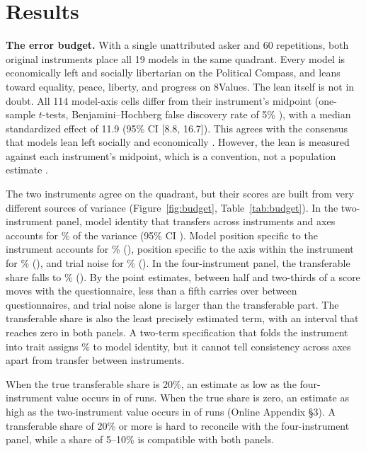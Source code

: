 \documentclass[12pt]{article}
\begin{document}
\section{Results}

\textbf{The error budget.} With a single unattributed asker
and 60 repetitions, both original instruments place all 19 models in the same quadrant. Every model is economically
left and socially libertarian on the Political Compass, and leans toward equality, peace, liberty, and progress on
8Values. The lean itself is not in doubt. All 114 model-axis cells differ from their instrument's midpoint (one-sample
$t$-tests, Benjamini--Hochberg false discovery rate of 5\% \citep{benjamini1995}), with a median standardized effect of
11.9 (95\% CI [8.8, 16.7]). This agrees with the consensus that models lean left socially and economically \citep{rozado2024, motoki2024}. However, the lean is measured against each instrument's midpoint, which is a convention,
not a population estimate \citep{gallup2024values}.

The two instruments agree on the quadrant, but their scores are built from very different sources of variance
(Figure~\ref{fig:budget}, Table~\ref{tab:budget}). In the two-instrument panel, model identity that transfers across
instruments and axes accounts for \NTwoM\% of the variance (95\% CI \NTwoMci). Model position specific to the
instrument accounts for \NTwoMI\% (\NTwoMIci), position specific to the axis within the instrument for \NTwoMA\%
(\NTwoMAci), and trial noise for \NTwoE\% (\NTwoEci). In the four-instrument panel, the transferable share falls to
\NFourM\% (\NFourMci). By the point estimates, between half and two-thirds of a score moves with the
questionnaire, less than a fifth carries over between questionnaires, and trial noise alone is larger than the
transferable part. The transferable share is also the least precisely estimated term, with an interval that reaches
zero in both panels. A two-term specification that folds the instrument into trait assigns \OTwoM\% to model identity,
but it cannot tell consistency across axes apart from transfer between instruments.

When the true transferable share is 20\%, an estimate as low as the
four-instrument value occurs in \SimFourTwentyBelowN{} of \SimReps{} runs. When the true share is zero, an estimate as
high as the two-instrument value occurs in \SimTwoZeroAboveN{} of \SimReps{} runs (Online Appendix \S 3). A transferable
share of 20\% or more is hard to reconcile with the four-instrument panel, while a share of 5--10\% is
compatible with both panels.
\end{document}
